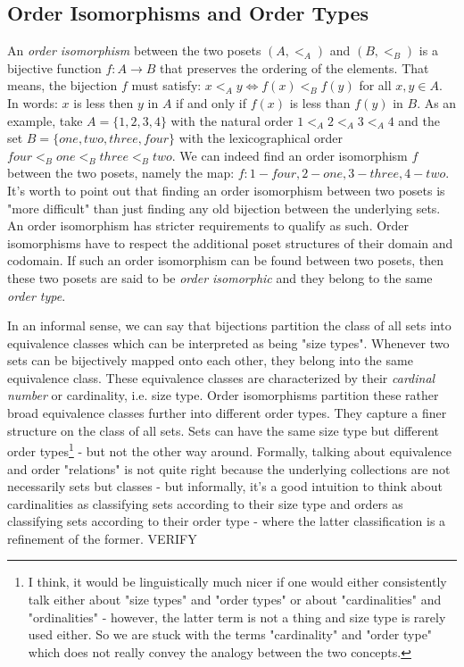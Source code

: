 \subsection{Order Isomorphisms and Order Types}
An \emph{order isomorphism} between the two posets $(A, <_A)$ and $(B, <_B)$ is a bijective function $f: A \rightarrow B$ that preserves the ordering of the elements. That means, the bijection $f$ must satisfy: $x <_A y \Leftrightarrow f(x) <_B f(y)$ for all $x,y \in A$. In words: $x$ is less then $y$ in $A$ if and only if $f(x)$ is less than $f(y)$ in $B$. As an example, take $A=\{1,2,3,4\}$ with the natural order $1 <_A 2 <_A 3 <_A 4$ and the set $B=\{one,two,three,four\}$ with the lexicographical order $four <_B one <_B three <_B two$. We can indeed find an order isomorphism $f$ between the two posets, namely the map: $f: 1-four, 2-one, 3-three, 4-two$. It's worth to point out that finding an order isomorphism between two posets is "more difficult" than just finding any old bijection between the underlying sets. An order isomorphism has stricter requirements to qualify as such. Order isomorphisms have to respect the additional poset structures of their domain and codomain. If such an order isomorphism can be found between two posets, then these two posets are said to be \emph{order isomorphic} and they belong to the same \emph{order type}.

\medskip
In an informal sense, we can say that bijections partition the class of all sets into equivalence classes which can be interpreted as being "size types". Whenever two sets can be bijectively mapped onto each other, they belong into the same equivalence class. These equivalence classes are characterized by their \emph{cardinal number} or cardinality, i.e. size type. Order isomorphisms partition these rather broad equivalence classes further into different order types. They capture a finer structure on the class of all sets. Sets can have the same size type but different order types\footnote{I think, it would be linguistically much nicer if one would either consistently talk either about "size types" and "order types" or about "cardinalities" and "ordinalities" - however, the latter term is not a thing and size type is rarely used either. So we are stuck with the terms "cardinality" and "order type" which does not really convey the analogy between the two concepts.} - but not the other way around. Formally, talking about equivalence and order "relations" is not quite right because the underlying collections are not necessarily sets but classes - but informally, it's a good intuition to think about cardinalities as classifying sets according to their size type and orders as classifying sets according to their order type - where the latter classification is a refinement of the former. VERIFY

